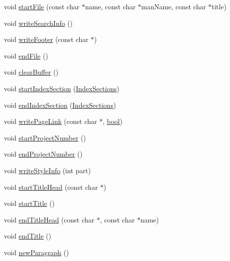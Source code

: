 \begin{DoxyCompactItemize}
\item 
void \hyperlink{class_latex_generator_a4658c98545414c4147d7e589f844c83c}{start\+File} (const char $\ast$name, const char $\ast$man\+Name, const char $\ast$title)
\item 
void \hyperlink{class_latex_generator_add0395c556a2d1b36d7d75c81473fb78}{write\+Search\+Info} ()
\item 
void \hyperlink{class_latex_generator_afc74e3c16856f30b050edebf0e83416e}{write\+Footer} (const char $\ast$)
\item 
void \hyperlink{class_latex_generator_a3f6c0d82d907c01684a159c6aa8fa880}{end\+File} ()
\item 
void \hyperlink{class_latex_generator_a6cb1e92e1a408514ee0a134eb955b0d4}{clear\+Buffer} ()
\item 
void \hyperlink{class_latex_generator_a94d916061c6268e319d34645f8cd84f6}{start\+Index\+Section} (\hyperlink{index_8h_aec03800047ada46460eb75113cfee322}{Index\+Sections})
\item 
void \hyperlink{class_latex_generator_a6380cb1cf2ed1498d638b889fe4165ca}{end\+Index\+Section} (\hyperlink{index_8h_aec03800047ada46460eb75113cfee322}{Index\+Sections})
\item 
void \hyperlink{class_latex_generator_a78988d6557001983a64797823dd49343}{write\+Page\+Link} (const char $\ast$, \hyperlink{qglobal_8h_a1062901a7428fdd9c7f180f5e01ea056}{bool})
\item 
void \hyperlink{class_latex_generator_a35d152d0defd8ec3cc319e1b1717e87a}{start\+Project\+Number} ()
\item 
void \hyperlink{class_latex_generator_a2bb769f495adda2f9b6e01aea5bd1eba}{end\+Project\+Number} ()
\item 
void \hyperlink{class_latex_generator_ac1feab4756dc9795d056b72cc74379e4}{write\+Style\+Info} (int part)
\item 
void \hyperlink{class_latex_generator_ab1e643c939b347638fcc36c2cb6c6f86}{start\+Title\+Head} (const char $\ast$)
\item 
void \hyperlink{class_latex_generator_a4d1236763a4e5149866e3bae4961b13c}{start\+Title} ()
\item 
void \hyperlink{class_latex_generator_a264ba2c261bfce85495574f970f26c67}{end\+Title\+Head} (const char $\ast$, const char $\ast$name)
\item 
void \hyperlink{class_latex_generator_a39f79e928a962730a332e6d9dd9b251e}{end\+Title} ()
\item 
void \hyperlink{class_latex_generator_a6c246c6a7fc6f612388e13eb89ff0b63}{new\+Paragraph} ()

\end{DoxyCompactItemize}
